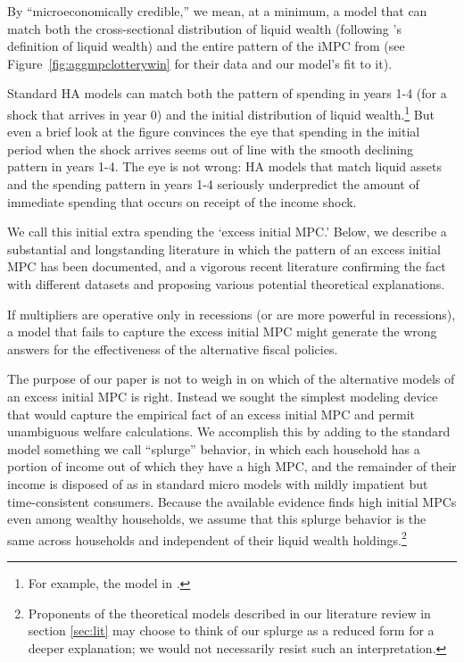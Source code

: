 \documentclass[\econtexRoot/HAFiscal]{subfiles}
\begin{document}
\hypertarget{microeconomically-credible}{}
By ``microeconomically credible,'' we mean, at a minimum, a model that can match both the cross-sectional distribution of liquid wealth (following \cite{kaplan2014model}'s definition of liquid wealth) and the entire pattern of the iMPC from \cite{fagereng_mpc_2021} (see Figure~\ref{fig:aggmpclotterywin} for their data and our model's fit to it).

\hypertarget{excess-initial-mpc}{}
Standard HA models can match both the pattern of spending in years 1-4 (for a shock that arrives in year 0) and the initial distribution of liquid wealth.\footnote{For example, the model in \cite{cstwMPC}.}  But even a brief look at the figure convinces the eye that spending in the initial period when the shock arrives seems out of line with the smooth declining pattern in years 1-4.  The eye is not wrong: HA models that match liquid assets and the spending pattern in years 1-4 seriously underpredict the amount of immediate spending that occurs on receipt of the income shock.

We call this initial extra spending the `excess initial MPC.'  Below, we describe a substantial and longstanding literature in which the pattern of an excess initial MPC has been documented, and a vigorous recent literature confirming the fact with different datasets and proposing various potential theoretical explanations.

If multipliers are operative only in recessions (or are more powerful in recessions), a model that fails to capture the excess initial MPC might generate the wrong answers for the effectiveness of the alternative fiscal policies.

The purpose of our paper is not to weigh in on which of the alternative models of an excess initial MPC is right.  Instead we sought the simplest modeling device that would capture the empirical fact of an excess initial MPC and permit unambiguous welfare calculations.  We accomplish this by adding to the standard model something we call ``splurge'' behavior, in which each household has a portion of income out of which they have a high MPC, and the remainder of their income is disposed of as in standard micro models with mildly impatient but time-consistent consumers.  Because the available evidence finds high initial MPCs even among wealthy households, we assume that this splurge behavior is the same across households and independent of their liquid wealth holdings.\footnote{Proponents of the theoretical models described in our literature review in section \ref{sec:lit} may choose to think of our splurge as a reduced form for a deeper explanation; we would not necessarily resist such an interpretation.}
\end{document}
